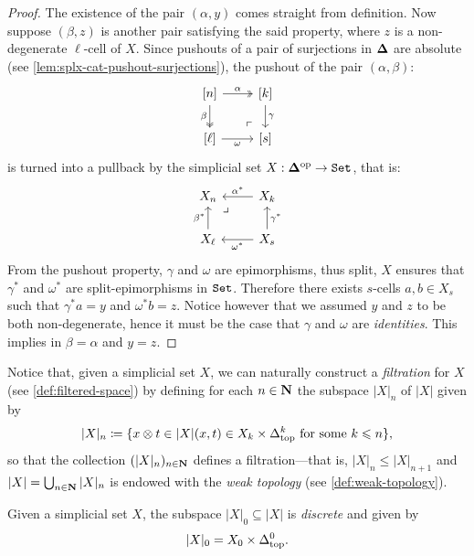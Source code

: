 \begin{proof}
The existence of the pair \((\alpha, y)\) comes straight from definition. Now
suppose \((\beta, z)\) is another pair satisfying the said property, where \(z\)
is a non-degenerate \(\ell\)-cell of \(X\). Since pushouts of a pair of
surjections in \({\mathbf{\Delta}}\) are absolute (see
\cref{lem:splx-cat-pushout-surjections}), the pushout of the pair
\((\alpha, \beta)\):
\[
\begin{tikzcd}
{[n]} \ar[r, two heads, "\alpha"]
\ar[d, two heads, "\beta"']
\ar[dr, phantom, "\ulcorner", very near end]
&{[k]} \ar[d, "\gamma"] \\
{[\ell]} \ar[r, "\omega"'] &{[s]}
\end{tikzcd}
\]
is turned into a pullback by the simplicial set \(X: {\mathbf{\Delta}}^{\mathrm{op}} \to {\texttt{Set}}\),
that is:
\[
\begin{tikzcd}
X_n \ar[rd, phantom, very near start, "\lrcorner"]
&X_k \ar[l, "\alpha^{*}"']
\\
X_{\ell} \ar[u, "\beta^{*}"]
&X_s \ar[u, "\gamma^{*}"'] \ar[l, "\omega^{*}"]
\end{tikzcd}
\]
From the pushout property, \(\gamma\) and \(\omega\) are epimorphisms, thus
split, \(X\) ensures that \(\gamma^{*}\) and \(\omega^{*}\) are
split-epimorphisms in \({\texttt{Set}}\). Therefore there exists \(s\)-cells
\(a, b \in X_s\) such that \(\gamma^{*} a = y\) and \(\omega^{*} b = z\). Notice
however that we assumed \(y\) and \(z\) to be both non-degenerate, hence it must
be the case that \(\gamma\) and \(\omega\) are \emph{identities}. This implies
in \(\beta = \alpha\) and \(y = z\).
\end{proof}

Notice that, given a simplicial set \(X\), we can naturally construct a
\emph{filtration} for \(X\) (see \cref{def:filtered-space}) by defining for each
\(n \in \mathbf{N}\) the subspace \(|X|_n\) of \(|X|\) given by
\[
|X|_n \coloneq \{
x \otimes t \in |X| \relax
(x, t) \in X_k \times \Delta_{\text{top}}^k
\text{ for some } k \leqslant n
\},
\]
so that the collection \((|X|_n)_{n \in \mathbf{N}}\) defines a filtration---that is,
\(|X|_n \leq |X|_{n+1}\) and \(|X| = \bigcup_{n \in \mathbf{N}} |X|_n\) is endowed with
the \emph{weak topology} (see \cref{def:weak-topology}).

\begin{lemma}
\label{lem:X0-simplicial-set-is-discrete}
Given a simplicial set \(X\), the subspace \(|X|_0 \subseteq |X|\) is
\emph{discrete} and given by
\[
|X|_0 = X_0 \times \Delta_{\text{top}}^0.
\]
\end{lemma}

